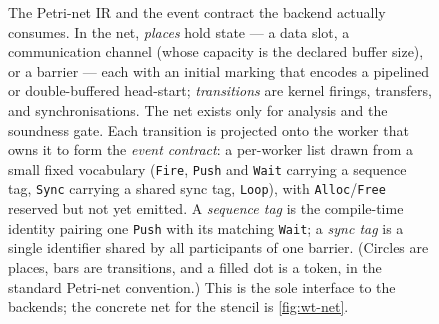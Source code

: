 \begin{figure}[tbp]
{}
  \caption[The Petri-net IR and the event contract]{The Petri-net IR and the
    event contract the backend actually consumes. In the net, \emph{places} hold
    state --- a data slot, a communication channel (whose capacity is the declared
    buffer size), or a barrier --- each with an initial marking that encodes a
    pipelined or double-buffered head-start; \emph{transitions} are kernel
    firings, transfers, and synchronisations. The net exists only for analysis
    and the soundness gate. Each transition is projected onto the worker that owns
    it to form the \emph{event contract}: a per-worker list drawn from a small
    fixed vocabulary (\texttt{Fire}, \texttt{Push} and \texttt{Wait} carrying a
    sequence tag, \texttt{Sync} carrying a shared sync tag, \texttt{Loop}), with
    \texttt{Alloc}/\texttt{Free} reserved but not yet emitted. A \emph{sequence
    tag} is the compile-time identity pairing one \texttt{Push} with its matching
    \texttt{Wait}; a \emph{sync tag} is a single identifier shared by all
    participants of one barrier. (Circles are places, bars are transitions, and a
    filled dot is a token, in the standard Petri-net convention.) This is the sole
    interface to the backends; the concrete net for the stencil is
    \cref{fig:wt-net}.}
  \label{fig:petri}
\end{figure}
